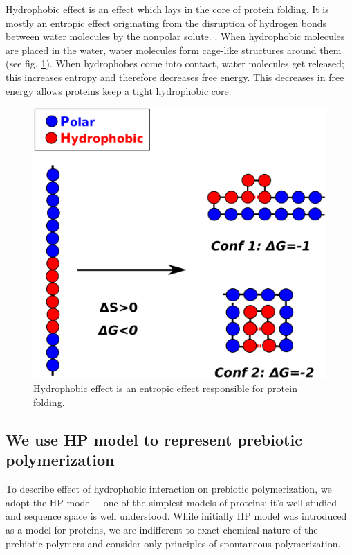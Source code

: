 \documentclass[twoside,twocolumn,9pt]{article}
\begin{document}
Hydrophobic effect is an effect which lays in the core of protein folding. It is mostly an 
entropic effect originating from the disruption of hydrogen bonds between water 
molecules by the nonpolar solute. \cite{Silverstein1998}. When hydrophobic molecules are placed in 
the water, water molecules form cage-like structures around them (see fig. \ref{fig:hydro-effect}). 
When hydrophobes come into contact, water molecules get released; this increases entropy and 
therefore decreases free energy. This decreases in free energy allows proteins keep a tight 
hydrophobic core.
\begin{figure}[h!]
  \centering
  \includegraphics[width=\columnwidth]{pictures/hp-model.pdf} 
  \caption{Hydrophobic effect is an entropic effect responsible for protein folding. }
  \label{fig:hydro-effect}
\end{figure}

\subsection{We use HP model to represent prebiotic polymerization}
To describe effect of hydrophobic interaction on prebiotic polymerization, we adopt the HP model 
-- one of the simplest models of proteins; it's well studied and sequence space is well 
understood\cite{lau1989lattice,Chan1991,Miller1995,Yue1995,agarwala1997local}. While initially HP 
model was introduced as a model for proteins, we are indifferent to exact chemical nature of the 
prebiotic polymers and consider only principles of spontaneous polymerization.
\end{document}

